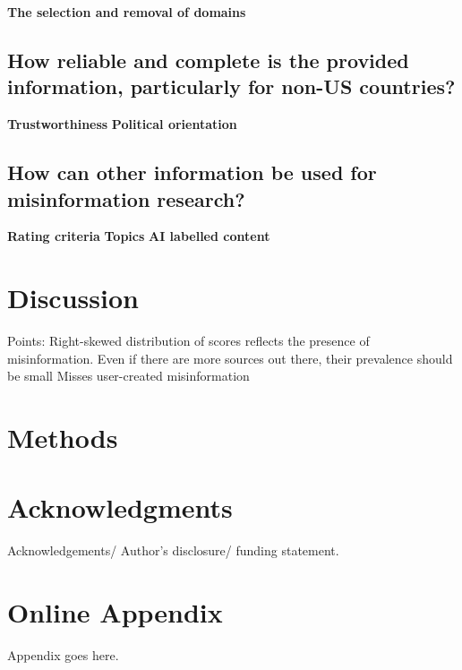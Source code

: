 \documentclass[12pt,twoside]{article}
\begin{document}
\textbf{The selection and removal of domains}

\subsection{How reliable and complete is the provided information, particularly for non-US countries?}
\textbf{Trustworthiness}
\textbf{Political orientation}

\subsection{How can other information be used for misinformation research?}
\textbf{Rating criteria}
\textbf{Topics}
\textbf{AI labelled content}

\section{Discussion}
Points:
Right-skewed distribution of scores reflects the presence of misinformation. Even if there are more sources out there, their prevalence should be small
Misses user-created misinformation


\section{Methods}

\section{Acknowledgments}
Acknowledgements/ Author's disclosure/ funding statement.



\appendix
\section{Online Appendix}
Appendix goes here.
\end{document}
